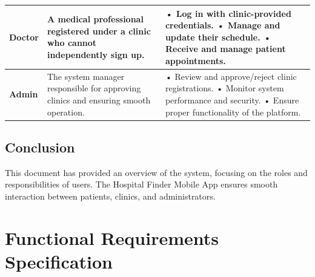 \documentclass[12pt]{report}
\begin{document}
\begin{longtable}{|p{3cm}|p{6cm}|p{6cm}|}
	\hspace*{0.85cm}\textbf{Doctor}                                                                                            & A medical professional registered under a clinic who cannot independently sign up.  &
	• Log in with clinic-provided credentials.\newline
	• Manage and update their schedule.\newline
	• Receive and manage patient appointments.                                                                                                                                                                             \\
	\hline

	\hspace*{0.85cm}\textbf{Admin}                                                                                             & The system manager responsible for approving clinics and ensuring smooth operation. &
	• Review and approve/reject clinic registrations.\newline
	• Monitor system performance and security.\newline
	• Ensure proper functionality of the platform.                                                                                                                                                                         \\
	\hline


\end{longtable}




























\subsection{Conclusion}
This document has provided an overview of the system, focusing on the roles and responsibilities of users. The Hospital Finder Mobile App ensures smooth interaction between patients, clinics, and administrators.
\vspace{0.5cm}
\section{\textbf{Functional Requirements Specification}}
\end{document}
